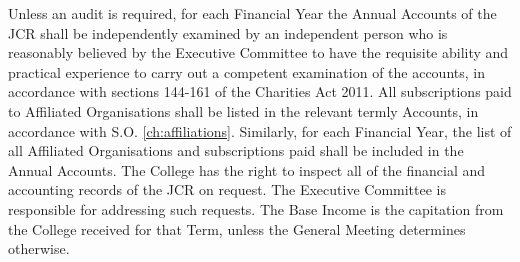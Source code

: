 \npara Unless an audit is required, for each Financial Year the Annual Accounts of the JCR shall be independently examined by an independent person who is reasonably believed by the Executive Committee to have the requisite ability and practical experience to carry out a competent examination of the accounts, in accordance with sections 144-161 of the Charities Act 2011.
\npara All subscriptions paid to Affiliated Organisations shall be listed in the relevant termly Accounts, in accordance with S.O. \ref{ch:affiliations}.  Similarly, for each Financial Year, the list of all Affiliated Organisations and subscriptions paid shall be included in the Annual Accounts.
\npara The College has the right to inspect all of the financial and accounting records of the JCR on request. The Executive Committee is responsible for addressing such requests.
\npara The Base Income is the capitation from the College received for that Term, unless the General Meeting determines otherwise.

